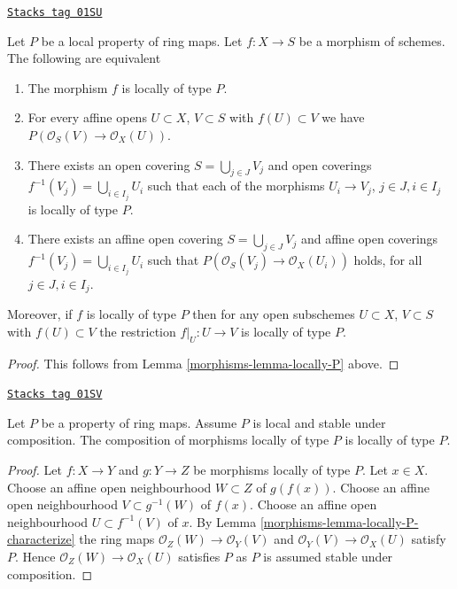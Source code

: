 \begin{lemma}
\label{morphisms-lemma-locally-P-characterize}
\href{https://stacks.math.columbia.edu/tag/01SU}{\texttt{Stacks tag 01SU}}

Let $P$ be a local property of ring maps.
Let $f : X \to S$ be a morphism of schemes.
The following are equivalent
\begin{enumerate}
\item The morphism $f$ is locally of type $P$.
\item For every affine opens $U \subset X$, $V \subset S$
with $f(U) \subset V$ we have $P(\mathcal{O}_S(V) \to \mathcal{O}_X(U))$.
\item There exists an open covering $S = \bigcup_{j \in J} V_j$
and open coverings $f^{-1}(V_j) = \bigcup_{i \in I_j} U_i$ such
that each of the morphisms $U_i \to V_j$, $j\in J, i\in I_j$
is locally of type $P$.
\item There exists an affine open covering $S = \bigcup_{j \in J} V_j$
and affine open coverings $f^{-1}(V_j) = \bigcup_{i \in I_j} U_i$ such
that $P(\mathcal{O}_S(V_j) \to \mathcal{O}_X(U_i))$ holds, for all
$j\in J, i\in I_j$.
\end{enumerate}
Moreover, if $f$ is locally of type $P$ then for
any open subschemes $U \subset X$, $V \subset S$ with $f(U) \subset V$
the restriction $f|_U : U \to V$ is locally of type $P$.
\end{lemma}

\begin{proof}

This follows from Lemma \ref{morphisms-lemma-locally-P} above.
\end{proof}

\begin{lemma}
\label{morphisms-lemma-composition-type-P}
\href{https://stacks.math.columbia.edu/tag/01SV}{\texttt{Stacks tag 01SV}}

Let $P$ be a property of ring maps.
Assume $P$ is local and stable under composition.
The composition of morphisms locally of type $P$ is
locally of type $P$.
\end{lemma}

\begin{proof}

Let $f : X \to Y$ and $g : Y \to Z$ be morphisms locally of type $P$.
Let $x \in X$. Choose an affine open neighbourhood $W \subset Z$ of
$g(f(x))$. Choose an affine open neighbourhood $V \subset g^{-1}(W)$
of $f(x)$. Choose an affine open neighbourhood $U \subset f^{-1}(V)$
of $x$. By Lemma \ref{morphisms-lemma-locally-P-characterize} the ring maps
$\mathcal{O}_Z(W) \to \mathcal{O}_Y(V)$ and
$\mathcal{O}_Y(V) \to \mathcal{O}_X(U)$ satisfy $P$.
Hence $\mathcal{O}_Z(W) \to \mathcal{O}_X(U)$ satisfies $P$
as $P$ is assumed stable under composition.
\end{proof}

